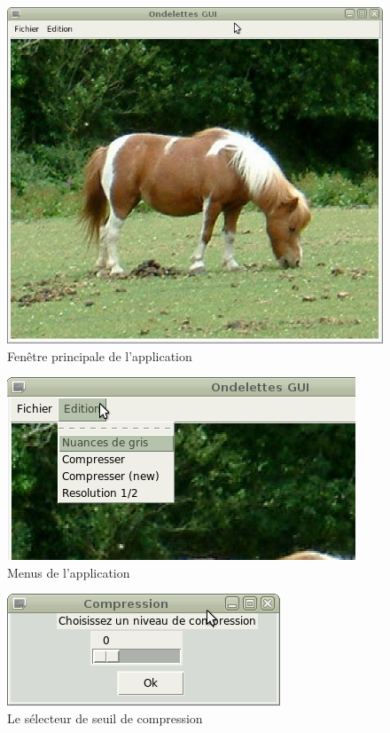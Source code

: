 \documentclass{article}
\begin{document}
\begin{figure}[!hb]
\centering
\includegraphics[scale=0.5]{images/OndelettesGUI.png}
\caption{Fenêtre principale de l'application}
\label{GUI}
\end{figure}

\begin{figure}[!ht]
\centering
\includegraphics[scale=0.8]{images/OndelettesGUI1.png}
\caption{Menus de l'application}
\label{GUI1}
\end{figure}

\begin{figure}[!hb]
\centering
\includegraphics[scale=0.8]{images/Compression.png}
\caption{Le sélecteur de seuil de compression}
\label{GUI2}
\end{figure}
\end{document}
